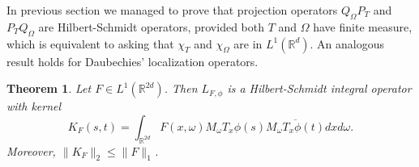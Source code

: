 \documentclass[corpo=11pt, stile=classica, tipotesi=custom,
greek, evenboxes, english]{toptesi}
\numberwithin{equation}{chapter}
\newtheorem{teo}{Theorem}[chapter] %
\theoremstyle{definition}
\theoremstyle{remark}
\newcommand{\R}{\mathbb{R}} %
\begin{document}
In previous section we managed to prove that projection operators $Q_{\Omega}P_T$ and $P_T Q_{\Omega}$ are Hilbert-Schmidt operators, provided both $T$ and $\Omega$ have finite measure, which is equivalent to asking that $\chi_T$ and $\chi_{\Omega}$ are in $L^1(\R^d)$. An analogous result holds for Daubechies' localization operators.
\begin{teo}\label{F integrable L_F Hilbert-Schmidt}
	Let $F \in L^1(\R^{2d})$. Then $L_{F,\phi}$ is a Hilbert-Schmidt integral operator with kernel
	\begin{equation}\label{integral kernel localization operator}
		K_F(s,t) = \int_{\R^{2d}} F(x,\omega) M_{\omega} T_x \phi(s) \overline{M_{\omega} T_x \phi(t)} dx d\omega.
	\end{equation}
	Moreover, $\|K_F\|_2 \leq \|F\|_1$.
\end{teo}
\end{document}
